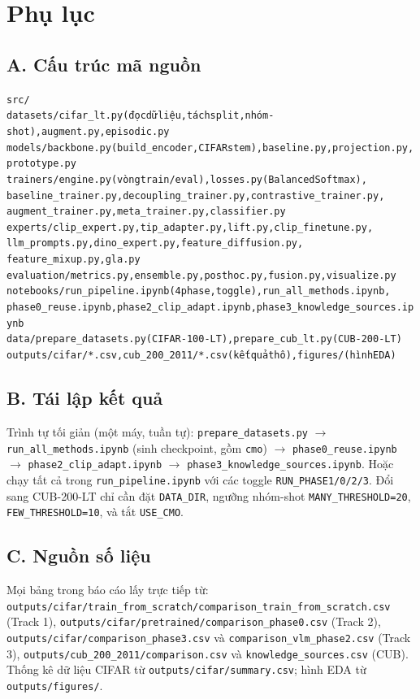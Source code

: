 \chapter*{Phụ lục}

\section*{A. Cấu trúc mã nguồn}

\begin{alltt}
src/
  datasets/   cifar_lt.py (đọc dữ liệu, tách split, nhóm-shot), augment.py, episodic.py
  models/     backbone.py (build_encoder, CIFAR stem), baseline.py, projection.py, prototype.py
  trainers/   engine.py (vòng train/eval), losses.py (Balanced Softmax),
              baseline_trainer.py, decoupling_trainer.py, contrastive_trainer.py,
              augment_trainer.py, meta_trainer.py, classifier.py
  experts/    clip_expert.py, tip_adapter.py, lift.py, clip_finetune.py,
              llm_prompts.py, dino_expert.py, feature_diffusion.py,
              feature_mixup.py, gla.py
  evaluation/ metrics.py, ensemble.py, posthoc.py, fusion.py, visualize.py
notebooks/    run_pipeline.ipynb (4 phase, toggle), run_all_methods.ipynb,
              phase0_reuse.ipynb, phase2_clip_adapt.ipynb, phase3_knowledge_sources.ipynb
data/         prepare_datasets.py (CIFAR-100-LT), prepare_cub_lt.py (CUB-200-LT)
outputs/      cifar/*.csv, cub_200_2011/*.csv (kết quả thô), figures/ (hình EDA)
\end{alltt}

\section*{B. Tái lập kết quả}

Trình tự tối giản (một máy, tuần tự): \texttt{prepare\_datasets.py} $\rightarrow$
\texttt{run\_all\_methods.ipynb} (sinh checkpoint, gồm \texttt{cmo}) $\rightarrow$
\texttt{phase0\_reuse.ipynb} $\rightarrow$ \texttt{phase2\_clip\_adapt.ipynb} $\rightarrow$
\texttt{phase3\_knowledge\_sources.ipynb}. Hoặc chạy tất cả trong \texttt{run\_pipeline.ipynb} với
các toggle \texttt{RUN\_PHASE1/0/2/3}. Đổi sang CUB-200-LT chỉ cần đặt \texttt{DATA\_DIR}, ngưỡng
nhóm-shot \texttt{MANY\_THRESHOLD=20}, \texttt{FEW\_THRESHOLD=10}, và tắt \texttt{USE\_CMO}.

\section*{C. Nguồn số liệu}

Mọi bảng trong báo cáo lấy trực tiếp từ:
\texttt{outputs/cifar/train\_from\_scratch/comparison\_train\_from\_scratch.csv} (Track 1),
\texttt{outputs/cifar/pretrained/comparison\_phase0.csv} (Track 2),
\texttt{outputs/cifar/comparison\_phase3.csv} và \texttt{comparison\_vlm\_phase2.csv} (Track 3),
\texttt{outputs/cub\_200\_2011/comparison.csv} và \texttt{knowledge\_sources.csv} (CUB).
Thống kê dữ liệu CIFAR từ \texttt{outputs/cifar/summary.csv}; hình EDA từ \texttt{outputs/figures/}.
